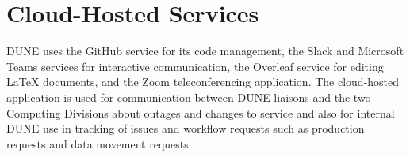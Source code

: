 \documentclass[../main-v1.tex]{subfiles}
\begin{document}
\section{Cloud-Hosted Services}
DUNE uses the GitHub service for its code management, the Slack and Microsoft Teams services for interactive communication, the Overleaf service for editing \LaTeX{} documents, and the Zoom teleconferencing application.  The cloud-hosted  application is used for communication between DUNE liaisons and the two
 Computing Divisions about outages and changes to service and also for internal DUNE use in 
tracking of issues and workflow requests such as production requests and data movement requests.
\end{document}
